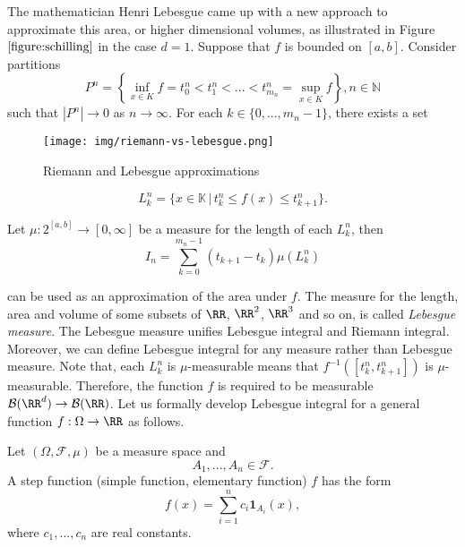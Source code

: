 The mathematician Henri Lebesgue came up with a new approach to approximate this area, or higher dimensional volumes, as illustrated in Figure $\ref{figure:schilling}$ in the case $d=1$. Suppose that $f$ is bounded on $[a,b]$. Consider partitions $$P^n=\left\{\inf\limits_{x\in K} f=t^n_0<t^n_1<...<t^n_{m_n}=\sup\limits_{x\in K} f\right\}, n\in\mathbb{N}$$ such that $|P^n|\to 0$ as $n\to\infty$. For each $k\in\{0,...,m_n-1\}$, there exists a set

\begin{figure}
    \centering
    \texttt{[image: img/riemann-vs-lebesgue.png]}
    \vspace{0.5cm}
    \caption[Riemann and Lebesgue approximations]{Riemann and Lebesgue approximations \cite{schilling2017measures}}
    \label{figure:schilling}
\end{figure}



$$L_k^n=\{x\in\mathbb{K} \,|\, t_k^n\le f(x)\le t_{k+1}^n\}.$$

Let $\mu:2^{[a,b]}\to[0,\infty]$ be a measure for the length of each $L_k^n$, then
\begin{equation}
    I_n=\sum\limits_{k=0}^{m_n-1}(t_{k+1}-t_k)\mu(L_k^n)
\end{equation}

can be used as an approximation of the area under $f$. The measure for the length, area and volume of some subsets of $\RR$, $\RR^2$, $\RR^3$ and so on, is called \textit{Lebesgue measure}. The Lebesgue measure unifies Lebesgue integral and Riemann integral. Moreover, we can define Lebesgue integral for any measure rather than Lebesgue measure. Note that, each $L^n_k$ is $\mu$-measurable means that $f^{-1}([t_k^n, t^n_{k+1}])$ is $\mu$-measurable. Therefore, the function $f$ is required to be measurable $\mathcal{B}(\RR^d)\to\mathcal{B}(\RR)$. Let us formally develop Lebesgue integral for a general function $f:\Omega\to\RR$ as follows.

\begin{definition}
    Let $(\Omega, \mathcal{F}, \mu)$ be a measure space and $$A_1,...,A_n\in\mathcal{F}.$$ A  step function (simple function, elementary function) $f$ has the form
    \begin{equation}
        f(x)=\sum\limits_{i=1}^nc_i\mathbf{1}_{A_i}(x),
    \end{equation}
    where $c_1,...,c_n$ are real constants.
\end{definition}

